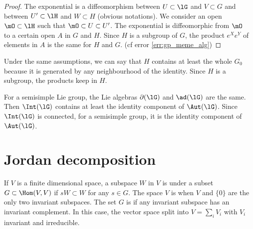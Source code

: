 \begin{proof}
The exponential is a diffeomorphism between $U\subset\lG$ and $V\subset G$ and between $U'\subset\lH$ and $W\subset H$ (obvious notations). We consider an open $\mO\subset\lH$ such that $\mO\subset U\subset U'$. The exponential is diffeomorphic from $\mO$ to a certain open $A$ in $G$ and $H$. Since $H$ is a subgroup of $G$, the product $e^Xe^Y$ of elements in $A$ is the same for $H$ and $G$. (cf error \ref{err:gp_meme_alg})
\end{proof}

Under the same assumptions, we can say that $H$ contains at least the whole $G_0$ because it is generated by any neighbourhood of the identity. Since $H$ is a subgroup, the products keep in $H$.

For a semisimple Lie group, the Lie algebras $\partial(\lG)$ and $\ad(\lG)$ are the same. Then $\Int(\lG)$ contains at least the identity component of $\Aut(\lG)$. Since $\Int(\lG)$ is connected, for a semisimple group, it is the identity component of $\Aut(\lG)$.

\section{Jordan decomposition}

If $V$ is a finite dimensional space, a subspace $W$ in $V$ is  under a subset $G\subset\Hom(V,V)$ if $sW\subset W$ for any $s\in G$. The space $V$ is  when $V$ and $\{0\}$ are the only two invariant subspaces. The set $G$ is  if any invariant subspace has an invariant complement. In this case, the vector space split into $V=\sum_iV_i$ with $V_i$ invariant and irreducible.

